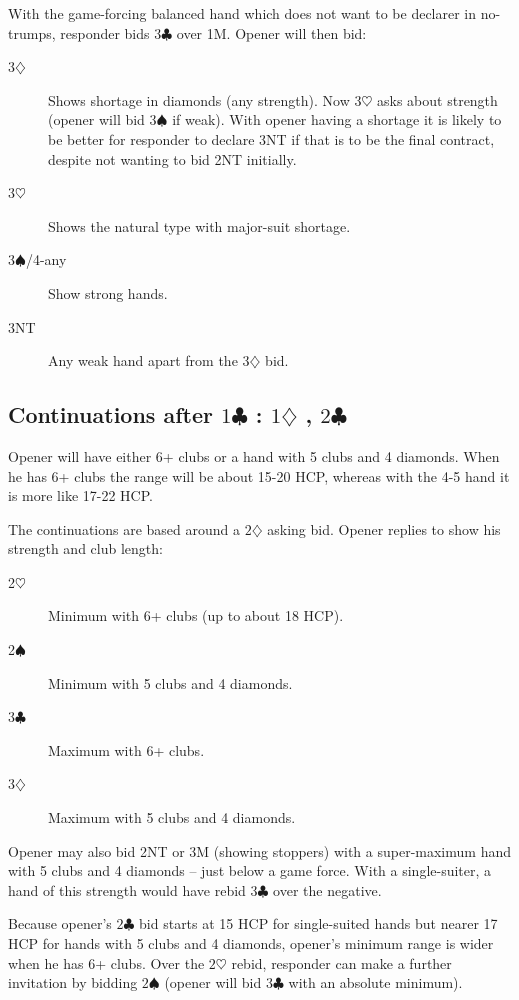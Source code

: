 \documentclass{article}
\newcommand{\sz}{\spadesuit}
\newcommand{\hz}{\heartsuit}
\newcommand{\dz}{\diamondsuit}
\newcommand{\cz}{\clubsuit}
\begin{document}
\vspace{4mm}
With the game-forcing balanced hand which does not want to be declarer in no-trumps, responder bids $3\cz$ over 1M. Opener will then bid:
\begin{description}
\item[3$\dz$] Shows shortage in diamonds (any strength). Now $3\hz$ asks about strength (opener will bid $3\sz$ if weak). With opener having a shortage it is likely to be better for responder to declare 3NT if that is to be the final contract, despite not wanting to bid 2NT initially.
\item[3$\hz$] Shows the natural type with major-suit shortage.
\item[3$\sz$/4-any] Show strong hands.
\item[3NT] Any weak hand apart from the $3\dz$ bid.
\end{description}

\subsection{Continuations after $1\cz$ : $1\dz$ , $2\cz$}

Opener will have either 6+ clubs or a hand with 5 clubs and 4 diamonds. When he has 6+ clubs the range will be about 15-20 HCP, whereas with the 4-5 hand it is more like 17-22 HCP.

The continuations are based around a $2\dz$ asking bid. Opener replies to show his strength and club length:
\begin{description}
\item[2$\hz$] Minimum with 6+ clubs (up to about 18 HCP).
\item[2$\sz$] Minimum with 5 clubs and 4 diamonds.
\item[3$\cz$] Maximum with 6+ clubs.
\item[3$\dz$] Maximum with 5 clubs and 4 diamonds.
\end{description}
Opener may also bid 2NT or 3M (showing stoppers) with a super-maximum hand with 5 clubs and 4 diamonds -- just below a game force. With a single-suiter, a hand of this strength would have rebid $3\cz$ over the negative.

Because opener's $2\cz$ bid starts at 15 HCP for single-suited hands but nearer 17 HCP for hands with 5 clubs and 4 diamonds, opener's minimum range is wider when he has 6+ clubs. Over the $2\hz$ rebid, responder can make a further invitation by bidding $2\sz$ (opener will bid $3\cz$ with an absolute minimum).
\end{document}
